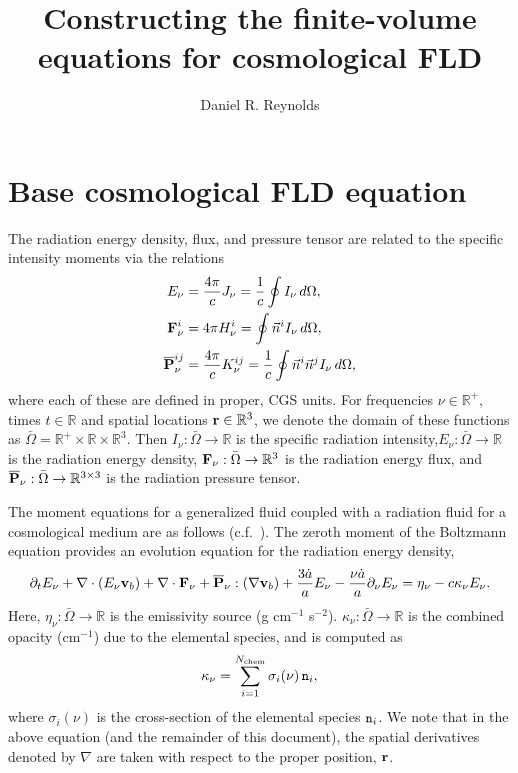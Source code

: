 \documentclass[10pt]{article}
\author{Daniel R. Reynolds}
\title{Constructing the finite-volume equations for cosmological FLD}
\renewcommand{\(}{\left(}
\renewcommand{\)}{\right)}
\newcommand{\vb}{{\bf v}_b}
\newcommand{\rvec}{{\bf r}}
\newcommand{\Omegabar}{\bar{\Omega}}
\newcommand{\adot}{\dot{a}}
\newcommand{\Enu}{E_{\nu}}
\newcommand{\Fnu}{{\bf F}_{\nu}}
\newcommand{\Pnu}{\overline{\bf P}_{\nu}}
\newcommand{\R}{\mathbb{R}}
\newcommand{\Rthree}{\R^3}
\newcommand{\mn}{{\tt n}}
\begin{document}
\maketitle


\section{Base cosmological FLD equation}
\label{sec:PDE}

The radiation energy density, flux, and pressure tensor are related
to the specific intensity moments via the relations
\begin{align}
  \label{eq:density_wrt_intensity}
  \Enu &= \frac{4\pi}{c} J_{\nu} = \frac1c \oint I_{\nu} \,d\Omega, \\
  \label{eq:flux_wrt_intensity}
  \Fnu^i &= 4 \pi H^i_{\nu} = \oint \vec{n}^i I_{\nu} \,d\Omega, \\
  \label{eq:pressure_wrt_intensity}
  \Pnu^{ij} &= \frac{4\pi}{c} K^{ij}_\nu = \frac1c \oint \vec{n}^i
    \vec{n}^j I_{\nu} \,d\Omega,
\end{align}
where each of these are defined in proper, CGS units.  
For frequencies $\nu\in\R^+$, times $t\in\R$ and spatial locations
$\rvec\in\R^3$, we denote the domain of these functions as $\Omegabar
= \R^+\times\R\times\R^3$. Then $I_{\nu}:\Omegabar\rightarrow\R$ is
the specific radiation intensity,$\Enu:\Omegabar\rightarrow\R$ is the
radiation energy density, $\Fnu:\Omegabar\rightarrow\Rthree$ is the
radiation energy flux, and $\Pnu:\Omegabar\rightarrow\R^{3\times 3}$
is the radiation pressure tensor. 

The moment equations for a generalized fluid coupled with a radiation
fluid for a cosmological medium are as follows
(c.f.~\cite{HayesNorman2003,Paschos2005}).  The zeroth moment of the 
Boltzmann equation provides an evolution equation for the radiation
energy density,
\begin{equation}
\label{eq:zero_mom}
  \partial_{t} E_{\nu} + \nabla\cdot(\Enu\vb) 
    + \nabla\cdot\Fnu + \Pnu:(\nabla\vb) + \frac{3\adot}{a}\Enu -
    \frac{\nu\adot}{a}\partial_{\nu} \Enu
  = \eta_{\nu} -c \kappa_{\nu} \Enu.
\end{equation}
Here, $\eta_{\nu}:\Omegabar\rightarrow\R$ is the emissivity source
(g cm$^{-1}$ s$^{-2}$).  $\kappa_{\nu}:\Omegabar\rightarrow\R$ is the
combined opacity (cm$^{-1}$) due to the elemental species, and is
computed as 
\begin{equation}
\label{eq:opacity_def}
  \kappa_{\nu} = \sum_{i=1}^{N_\text{chem}} \sigma_{i}(\nu)\,\mn_i,
\end{equation}
where $\sigma_i(\nu)$ is the cross-section of the elemental species
$\mn_i$.  We note that in the above equation (and the remainder of
this document), the spatial derivatives denoted by $\nabla$ are taken
with respect to the proper position, $\rvec$.
\end{document}
